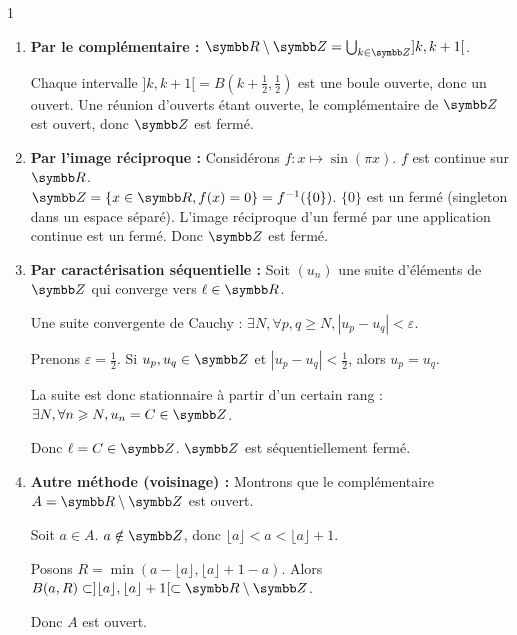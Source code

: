 \begin{correction}{1}
\begin{enumerate}
    \item \textbf{Par le complémentaire :}
        $\R \setminus \Z = \bigcup_{k \in \Z} ]k, k+1[$.

        Chaque intervalle $]k, k+1[ = B(k+\frac{1}{2}, \frac{1}{2})$ est une boule ouverte, donc un ouvert.
        Une réunion d'ouverts étant ouverte, le complémentaire de $\Z$ est ouvert, donc $\Z$ est fermé.

    \item \textbf{Par l'image réciproque :}
        Considérons $f : x \mapsto \sin(\pi x)$.
        $f$ est continue sur $\R$. \\
        $\Z = \{ x \in \R, f(x)=0 \} = f^{-1}(\{0\})$.
        $\{0\}$ est un fermé (singleton dans un espace séparé). 
        L'image réciproque d'un fermé par une application continue est un fermé. 
        Donc $\Z$ est fermé.

    \item \textbf{Par caractérisation séquentielle :}
        Soit $(u_{n})$ une suite d'éléments de $\Z$ qui converge vers $\ell \in \R$.

        Une suite convergente de Cauchy : $\exists N, \forall p,q \geqslant N, |u_{p} - u_{q}| < \varepsilon$.

        Prenons $\varepsilon = \frac{1}{2}$.
        Si $u_{p}, u_{q} \in \Z$ et $|u_{p} - u_{q}| < \frac{1}{2}$, alors $u_{p} = u_{q}$.

        La suite est donc stationnaire à partir d'un certain rang : $\exists N, \forall n \geqslant N, u_{n} = C \in \Z$.

        Donc $\ell = C \in \Z$. $\Z$ est séquentiellement fermé.

    \item \textbf{Autre méthode (voisinage) :}
        Montrons que le complémentaire $A = \R \setminus \Z$ est ouvert.

        Soit $a \in A$. $a \notin \Z$, donc $\lfloor a \rfloor < a < \lfloor a \rfloor + 1$.

        Posons $R = \min(a - \lfloor a \rfloor, \lfloor a \rfloor + 1 - a)$.
        Alors $B(a, R) \subset ]\lfloor a \rfloor, \lfloor a \rfloor + 1[ \subset \R \setminus \Z$.

        Donc $A$ est ouvert.
\end{enumerate}
\end{correction}

